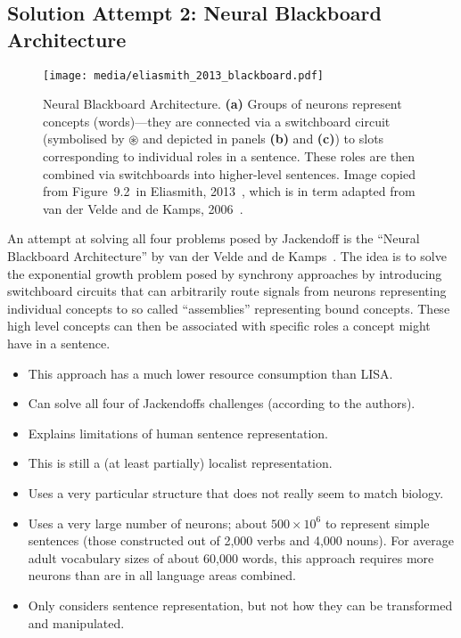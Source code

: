 \documentclass[10pt,letterpaper,oneside]{article}
\begin{document}
\subsection{Solution Attempt 2: Neural Blackboard Architecture}

\begin{figure}[t]
	\centering
	\texttt{[image: media/eliasmith\_2013\_blackboard.pdf]}
	\caption{Neural Blackboard Architecture. \textbf{(a)} Groups of neurons represent concepts (words)---they are connected via a switchboard circuit (symbolised by $\circledast$ and depicted in panels \textbf{(b)} and \textbf{(c)}) to slots corresponding to individual roles in a sentence. These roles are then combined via switchboards into higher-level sentences. Image copied from Figure~9.2~in Eliasmith, 2013~\cite{eliasmith2013how}, which is in term adapted from van der Velde and de Kamps, 2006~\cite{vandervelde2006neural}.}
\end{figure}

An attempt at solving all four problems posed by Jackendoff is the \enquote{Neural Blackboard Architecture} by van der Velde and de Kamps~\cite{vandervelde2006neural}. The idea is to solve the exponential growth problem posed by synchrony approaches by introducing switchboard circuits that can arbitrarily route signals from neurons representing individual concepts to so called \enquote{assemblies} representing bound concepts. These high level concepts can then be associated with specific roles a concept might have in a sentence.
\begin{itemize}
	\item[\OPlus] This approach has a much lower resource consumption than LISA.
	\item[\OPlus] Can solve all four of Jackendoffs challenges (according to the authors).
	\item[\OPlus] Explains limitations of human sentence representation.
	\item[\OMeh] This is still a (at least partially) localist representation.
	\item[\OMinus] Uses a very particular structure that does not really seem to match biology.
	\item[\OMinus] Uses a very large number of neurons; about $500\times 10^6$ to represent simple sentences (those constructed out of 2,000 verbs and 4,000 nouns). For average adult vocabulary sizes of about 60,000 words, this approach requires more neurons than are in all language areas combined.
	\item[\OMinus] Only considers sentence representation, but not how they can be transformed and manipulated.
\end{itemize}
\end{document}
